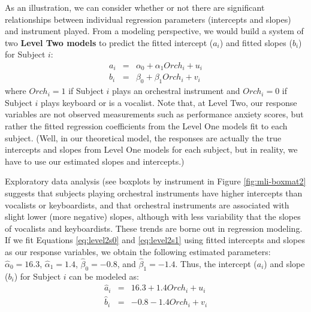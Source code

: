 \documentclass[
]{krantz}
\begin{document}
As an illustration, we can consider whether or not there are significant relationships between individual regression parameters (intercepts and slopes) and instrument played. From a modeling perspective, we would build a system of two \textbf{Level Two models} to predict the fitted intercept (\(a_{i}\)) and fitted slopes (\(b_{i}\)) for Subject \(i\):
\begin{eqnarray}
a_{i} & = & \alpha_{0}+\alpha_{1}\textstyle{Orch}_{i}+u_{i}
\label{eq:level2s0}  \\
b_{i} & = & \beta_{0}+\beta_{1}\textstyle{Orch}_{i}+v_{i}
\label{eq:level2s1}
\end{eqnarray}
where \(\textstyle{Orch}_{i}=1\) if Subject \(i\) plays an orchestral instrument and \(\textstyle{Orch}_{i}=0\) if Subject \(i\) plays keyboard or is a vocalist. Note that, at Level Two, our response variables are not observed measurements such as performance anxiety scores, but rather the fitted regression coefficients from the Level One models fit to each subject. (Well, in our theoretical model, the responses are actually the true intercepts and slopes from Level One models for each subject, but in reality, we have to use our estimated slopes and intercepts.)

Exploratory data analysis (see boxplots by instrument in Figure \ref{fig:mli-boxmat2} suggests that subjects playing orchestral instruments have higher intercepts than vocalists or keyboardists, and that orchestral instruments are associated with slight lower (more negative) slopes, although with less variability that the slopes of vocalists and keyboardists. These trends are borne out in regression modeling. If we fit Equations \eqref{eq:level2s0} and \eqref{eq:level2s1} using fitted intercepts and slopes as our response variables, we obtain the following estimated parameters: \(\hat{\alpha}_{0}=16.3\), \(\hat{\alpha}_{1}=1.4\), \(\hat{\beta}_{0}=-0.8\), and \(\hat{\beta}_{1}=-1.4\). Thus, the intercept (\(a_{i}\)) and slope (\(b_{i}\)) for Subject \(i\) can be modeled as:
\begin{eqnarray}
\hat{a}_{i} & = & 16.3+1.4\textstyle{Orch}_{i}+u_{i}
\label{eq:level2s0hat}  \\
\hat{b}_{i} & = & -0.8-1.4\textstyle{Orch}_{i}+v_{i}
\label{eq:level2s1hat}
\end{eqnarray}
\end{document}
